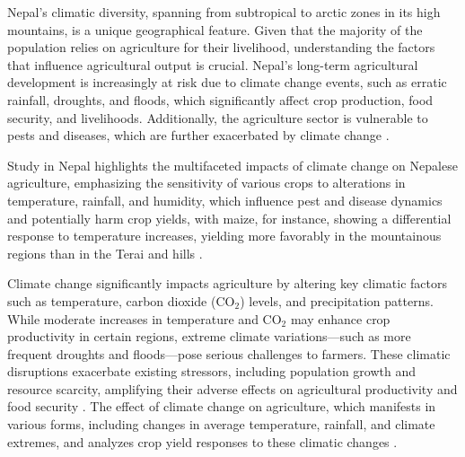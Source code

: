 Nepal’s climatic diversity, spanning from subtropical to arctic zones in its high mountains, is a unique geographical feature. Given that the majority of the population relies on agriculture for their livelihood, understanding the factors that influence agricultural output is crucial. Nepal's long-term agricultural development is increasingly at risk due to climate change events, such as erratic rainfall, droughts, and floods, which significantly affect crop production, food security, and livelihoods. Additionally, the agriculture sector is vulnerable to pests and diseases, which are further exacerbated by climate change \citep{gyawaliOverviewAgricultureNepal2021}.

Study in Nepal highlights the multifaceted impacts of climate change on Nepalese agriculture, emphasizing the sensitivity of various crops to alterations in temperature, rainfall, and humidity, which influence pest and disease dynamics and potentially harm crop yields, with maize, for instance, showing a differential response to temperature increases, yielding more favorably in the mountainous regions than in the Terai and hills \citep{mallaClimateChangeIts2009}.
 
Climate change significantly impacts agriculture by altering key climatic factors such as temperature, carbon dioxide (CO$_2$) levels, and precipitation patterns. While moderate increases in temperature and CO$_2$ may enhance crop productivity in certain regions, extreme climate variations—such as more frequent droughts and floods—pose serious challenges to farmers. These climatic disruptions exacerbate existing stressors, including population growth and resource scarcity, amplifying their adverse effects on agricultural productivity and food security \citep{global_paudel_2015}. The effect of climate change on agriculture, which manifests in various forms, including changes in average temperature, rainfall, and climate extremes, and analyzes crop yield responses to these climatic changes \citep{regmiCropYieldResponse2019}.

